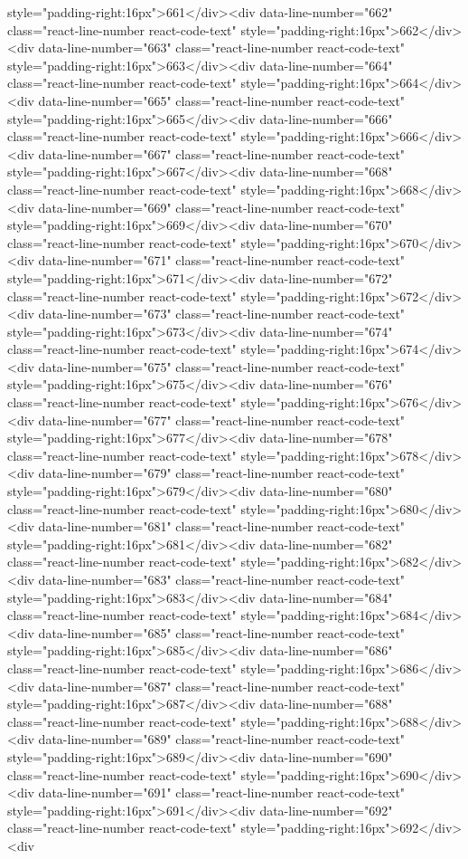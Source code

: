 {{{{{{{style="padding-right:16px">661</div><div data-line-number="662" class="react-line-number react-code-text" style="padding-right:16px">662</div><div data-line-number="663" class="react-line-number react-code-text" style="padding-right:16px">663</div><div data-line-number="664" class="react-line-number react-code-text" style="padding-right:16px">664</div><div data-line-number="665" class="react-line-number react-code-text" style="padding-right:16px">665</div><div data-line-number="666" class="react-line-number react-code-text" style="padding-right:16px">666</div><div data-line-number="667" class="react-line-number react-code-text" style="padding-right:16px">667</div><div data-line-number="668" class="react-line-number react-code-text" style="padding-right:16px">668</div><div data-line-number="669" class="react-line-number react-code-text" style="padding-right:16px">669</div><div data-line-number="670" class="react-line-number react-code-text" style="padding-right:16px">670</div><div data-line-number="671" class="react-line-number react-code-text" style="padding-right:16px">671</div><div data-line-number="672" class="react-line-number react-code-text" style="padding-right:16px">672</div><div data-line-number="673" class="react-line-number react-code-text" style="padding-right:16px">673</div><div data-line-number="674" class="react-line-number react-code-text" style="padding-right:16px">674</div><div data-line-number="675" class="react-line-number react-code-text" style="padding-right:16px">675</div><div data-line-number="676" class="react-line-number react-code-text" style="padding-right:16px">676</div><div data-line-number="677" class="react-line-number react-code-text" style="padding-right:16px">677</div><div data-line-number="678" class="react-line-number react-code-text" style="padding-right:16px">678</div><div data-line-number="679" class="react-line-number react-code-text" style="padding-right:16px">679</div><div data-line-number="680" class="react-line-number react-code-text" style="padding-right:16px">680</div><div data-line-number="681" class="react-line-number react-code-text" style="padding-right:16px">681</div><div data-line-number="682" class="react-line-number react-code-text" style="padding-right:16px">682</div><div data-line-number="683" class="react-line-number react-code-text" style="padding-right:16px">683</div><div data-line-number="684" class="react-line-number react-code-text" style="padding-right:16px">684</div><div data-line-number="685" class="react-line-number react-code-text" style="padding-right:16px">685</div><div data-line-number="686" class="react-line-number react-code-text" style="padding-right:16px">686</div><div data-line-number="687" class="react-line-number react-code-text" style="padding-right:16px">687</div><div data-line-number="688" class="react-line-number react-code-text" style="padding-right:16px">688</div><div data-line-number="689" class="react-line-number react-code-text" style="padding-right:16px">689</div><div data-line-number="690" class="react-line-number react-code-text" style="padding-right:16px">690</div><div data-line-number="691" class="react-line-number react-code-text" style="padding-right:16px">691</div><div data-line-number="692" class="react-line-number react-code-text" style="padding-right:16px">692</div><div }}}}}}}
